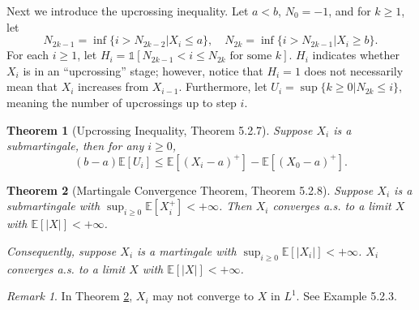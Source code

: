 \documentclass[openany]{book}
\newtheorem{theorem}{Theorem}[chapter]
\theoremstyle{definition}
\theoremstyle{remark}
\newtheorem*{remark}{Remark}
\begin{document}
Next we introduce the upcrossing inequality. Let $a<b$, $N_0=-1$, and for $k\ge1$, let
\begin{equation*}
    N_{2k-1}=\inf\{i>N_{2k-2}|X_i\le a\},\quad N_{2k}=\inf\{i>N_{2k-1}|X_i\ge b\}.
\end{equation*}
For each $i\ge1$, let $H_i=\mathds{1}[N_{2k-1}<i\le N_{2k}\textrm{ for some }k]$. $H_i$ indicates whether $X_i$ is in an ``upcrossing'' stage; however, notice that $H_i=1$ does not necessarily mean that $X_i$ increases from $X_{i-1}$. Furthermore, let $U_i=\sup\{k\ge0|N_{2k}\le i\}$, meaning the number of upcrossings up to step $i$.
\begin{theorem}[Upcrossing Inequality, \cite{D10} Theorem 5.2.7]
    Suppose $X_i$ is a submartingale, then for any $i\ge0$,
    \begin{equation*}
        (b-a)\mathbb{E}[U_i]\le \mathbb{E}\left[(X_i-a)^+\right]-\mathbb{E}\left[(X_0-a)^+\right].
    \end{equation*}
\end{theorem}
\begin{theorem}[Martingale Convergence Theorem, \cite{D10} Theorem 5.2.8]\label{thm:MGCT}
    Suppose $X_i$ is a submartingale with $\sup_{i\ge0}\mathbb{E}[X_i^+]<+\infty$. Then $X_i$ converges a.s. to a limit $X$ with $\mathbb{E}\left[|X|\right]<+\infty$.

    Consequently, suppose $X_i$ is a martingale with $\sup_{i\ge0}\mathbb{E}\left[|X_i|\right]<+\infty$. $X_i$ converges a.s. to a limit $X$ with $\mathbb{E}\left[|X|\right]<+\infty$.
\end{theorem}
\begin{remark}
    In Theorem \ref{thm:MGCT}, $X_i$ may not converge to $X$ in $L^1$. See \cite{D10} Example 5.2.3.
\end{remark}
\end{document}
